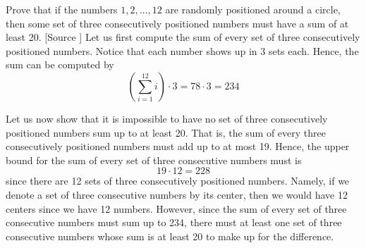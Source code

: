 \begin{hwproblem}{1}{
    Prove that if the numbers $1,2, \ldots, 12$ are randomly positioned around a 
    circle, then some set of three consecutively positioned numbers must have a 
    sum of at least 20.
  }
  [Source \cite{p1}]
  Let us first compute the sum of every set of three consecutively positioned
  numbers. Notice that each number shows up in 3 sets each. Hence, the sum can
  be computed by
  \[ \left(\sum_{i=1}^{12} i\right) \cdot 3 = 78 \cdot 3 = 234 \]

  Let us now show that it is impossible to have no set of three consecutively
  positioned numbers sum up to at least 20. That is, the sum of every three
  consecutively positioned numbers must add up to at most 19. Hence, the upper
  bound for the sum of every set of three consecutive numbers must is 
  \[ 19 \cdot 12 = 228 \]
  since there are 12 sets of three consecutively positioned numbers. Namely, if
  we denote a set of three consecutive numbers by its center, then we would have
  12 centers since we have 12 numbers. However, since the sum of every set of
  three consecutive numbers must sum up to 234, there must at least one set of
  three consecutive numbers whose sum is at least 20 to make up for the 
  difference.
\end{hwproblem}
